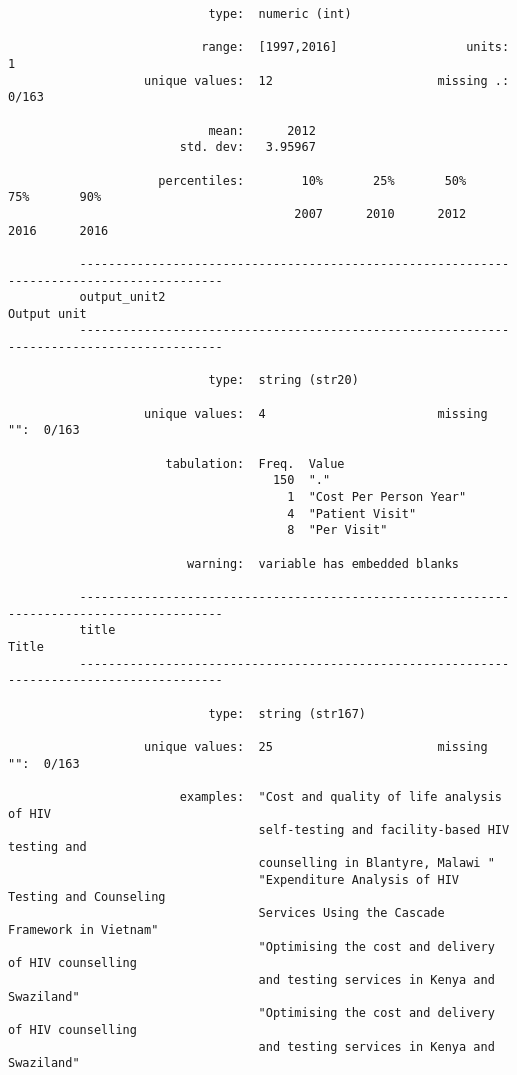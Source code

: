 \documentclass{article}
\begin{document}
\begin{verbatim}
                            type:  numeric (int)
          
                           range:  [1997,2016]                  units:  1
                   unique values:  12                       missing .:  0/163
          
                            mean:      2012
                        std. dev:   3.95967
          
                     percentiles:        10%       25%       50%       75%       90%
                                        2007      2010      2012      2016      2016
          
          ------------------------------------------------------------------------------------------
          output_unit2                                                                   Output unit
          ------------------------------------------------------------------------------------------
          
                            type:  string (str20)
          
                   unique values:  4                        missing "":  0/163
          
                      tabulation:  Freq.  Value
                                     150  "."
                                       1  "Cost Per Person Year"
                                       4  "Patient Visit"
                                       8  "Per Visit"
          
                         warning:  variable has embedded blanks
          
          ------------------------------------------------------------------------------------------
          title                                                                                Title
          ------------------------------------------------------------------------------------------
          
                            type:  string (str167)
          
                   unique values:  25                       missing "":  0/163
          
                        examples:  "Cost and quality of life analysis of HIV
                                   self-testing and facility-based HIV testing and
                                   counselling in Blantyre, Malawi "
                                   "Expenditure Analysis of HIV Testing and Counseling
                                   Services Using the Cascade Framework in Vietnam"
                                   "Optimising the cost and delivery of HIV counselling
                                   and testing services in Kenya and Swaziland"
                                   "Optimising the cost and delivery of HIV counselling
                                   and testing services in Kenya and Swaziland"
          

\end{verbatim}
\end{document}
